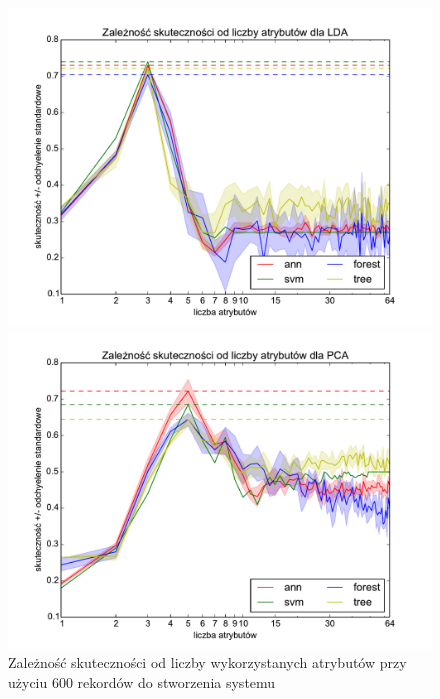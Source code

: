 \begin{figure}
\centering
\begin{minipage}{.5\textwidth}

\centering
\includegraphics[scale=\fesize]{res/digits_600_all_LinearDiscriminantAnalysis.pdf}

  
\end{minipage}%
\begin{minipage}{.5\textwidth}

\centering
\includegraphics[scale=\fesize]{res/digits_600_all_PCA.pdf}
  
\end{minipage}
\caption[Caption for LOF]{Zależność skuteczności od liczby wykorzystanych atrybutów przy użyciu 600 rekordów do stworzenia systemu\label{fe_600}}
\end{figure}



